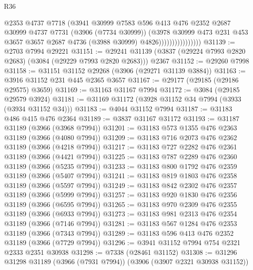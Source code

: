 \begin{lexlean}{R36}
\begin{coremodule}
                                @2353
                                @4737
                                @7718
                                (@3941
                                  @30999
                                  @7583
                                  @596
                                  @413
                                  @476
                                  @2352
                                  @2687
                                  @30999
                                  @4737
                                  @7731
                                  (@3906 (@7734 @30999))
                                  (@3978
                                    @30999
                                    @473
                                    @231
                                    @453
                                    @3657
                                    @3657
                                    @2687
                                    @4736
                                    (@3988 @30999)
                                    @4826))))))))))))))))
@31139 := @2703 @7994 @29221
@31151 := @29241 @31139 (@3837 (@29224 @7993 @2820 @2683) (@3084 (@29229 @7993 @2820 @2683))) @2367
@31152 := @29260 @7998
@31158 := @31151 @31152 @29268 (@3906 (@29271 @31139 @3884))
@31163 := @3916 @31152 @231 @445 @2365 @3657
@31167 := @29177 (@29185 (@29186 @29575) @3659)
@31169 := @31163 @31167 @7994
@31172 := @3084 (@29185 @29579 @3924)
@31181 := @31169 @31172 (@3928 @31152 @34 @7994 (@3933 (@3934 @31152 @34)))
@31183 := @4044 @31152 @7994
@31187 := @31183 @486 @415 @476 @2364
@31189 := @3837 @31167 @31172
@31193 := @31187 @31189 (@3966 (@3968 @7994))
@31201 := @31183 @573 @1355 @476 @2363 @31189 (@3966 (@4080 @7994))
@31209 := @31183 @716 @2073 @476 @2362 @31189 (@3966 (@4218 @7994))
@31217 := @31183 @727 @2282 @476 @2361 @31189 (@3966 (@4421 @7994))
@31225 := @31183 @787 @2289 @476 @2360 @31189 (@3966 (@5235 @7994))
@31233 := @31183 @800 @1792 @476 @2359 @31189 (@3966 (@5407 @7994))
@31241 := @31183 @819 @1803 @476 @2358 @31189 (@3966 (@5597 @7994))
@31249 := @31183 @842 @2302 @476 @2357 @31189 (@3966 (@5999 @7994))
@31257 := @31183 @920 @1830 @476 @2356 @31189 (@3966 (@6595 @7994))
@31265 := @31183 @970 @2309 @476 @2355 @31189 (@3966 (@6933 @7994))
@31273 := @31183 @981 @2313 @476 @2354 @31189 (@3966 (@7146 @7994))
@31281 := @31183 @567 @1284 @476 @2353 @31189 (@3966 (@7343 @7994))
@31289 := @31183 @596 @413 @476 @2352 @31189 (@3966 (@7729 @7994))
@31296 := @3941 @31152 @7994 @754 @2321 @2333 @2351 @30938
@31298 := @7338 (@28461 @31152)
@31308 := @31296 @31298 @31189 (@3966 (@7931 @7994)) (@3906 (@3907 @2321 @30938 @31152))

\end{coremodule}
\end{lexlean}
